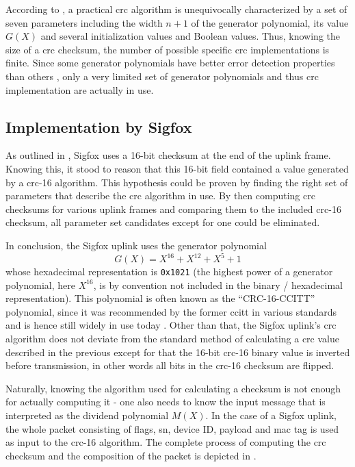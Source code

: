 According to \cite[Section 14]{crcguide}, a practical \gls{crc} algorithm is unequivocally characterized by a set of seven parameters including the width $n + 1$ of the generator polynomial, its value $G(X)$ and several initialization values and Boolean values.
Thus, knowing the size of a \gls{crc} checksum, the number of possible specific \gls{crc} implementations is finite.
Since some generator polynomials have better error detection properties than others \cite[Section 7]{crcguide}, only a very limited set of generator polynomials and thus \gls{crc} implementation are actually in use.

\subsection{Implementation by Sigfox}
\label{sec:uplink_crc_realization}
As outlined in , Sigfox uses a 16-bit checksum at the end of the uplink frame.
Knowing this, it stood to reason that this 16-bit field contained a value generated by a \gls{crc}-16 algorithm.
This hypothesis could be proven by finding the right set of parameters that describe the \gls{crc} algorithm in use.
By then computing \gls{crc} checksums for various uplink frames and comparing them to the included \gls{crc}-16 checksum, all parameter set candidates except for one could be eliminated.

In conclusion, the Sigfox uplink uses the generator polynomial
\begin{equation}
	G(X) = X^{16} + X^{12} + X^5 + 1
\end{equation}
whose hexadecimal representation is \texttt{0x1021} (the highest power of a generator polynomial, here $X^{16}$, is by convention not included in the binary / hexadecimal representation).
This polynomial is often known as the ``CRC-16-CCITT'' polynomial, since it was recommended by the former \gls{ccitt} in various standards \cite{ccittcrc} and is hence still widely in use today \cite[Section 14-2]{hackersdelight}.
Other than that, the Sigfox uplink's \gls{crc} algorithm does not deviate from the standard method of calculating a \gls{crc} value described in the previous  except for that the 16-bit \gls{crc}-16 binary value is inverted before transmission, in other words all bits in the \gls{crc}-16 checksum are flipped.

Naturally, knowing the algorithm used for calculating a checksum is not enough for actually computing it - one also needs to know the input message that is interpreted as the dividend polynomial $M(X)$.
In the case of a Sigfox uplink, the whole packet consisting of flags, \gls{sn}, device ID, payload and \gls{mac} tag is used as input to the \gls{crc}-16 algorithm.
The complete process of computing the \gls{crc} checksum and the composition of the packet is depicted in .

